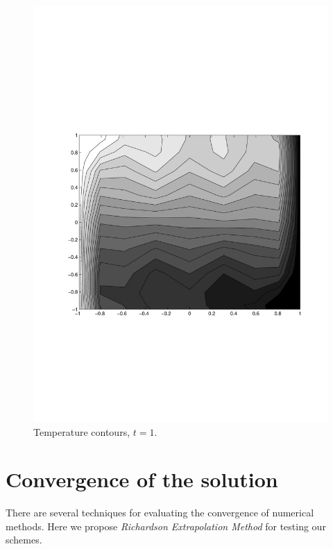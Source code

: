\begin{multicols}{2}
\begin{figure}[H]
\centering
\includegraphics[scale=0.45, trim = 30mm 75mm 15mm 80mm,
clip]{./Figures/4-IVBP/temperature_t_10.pdf} \caption{Temperature contours, $t=1$.}
\end{figure}

\end{multicols}

\vspace{0.5cm}

\section{Convergence of the solution}

There are several techniques for evaluating the convergence of numerical
methods. Here we propose \textit{Richardson Extrapolation Method} for testing
our schemes. \\

